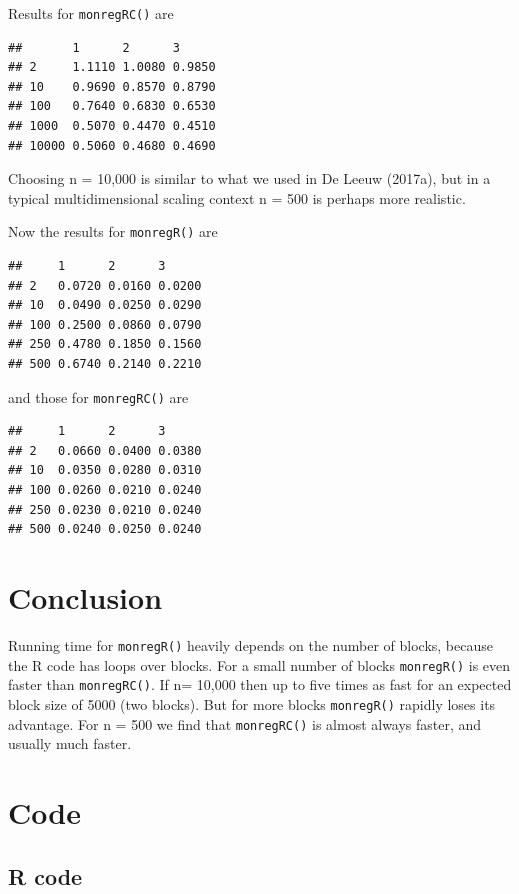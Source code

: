 \documentclass[12pt,]{article}
\begin{document}
Results for \texttt{monregRC()} are

\begin{verbatim}
##       1      2      3     
## 2     1.1110 1.0080 0.9850
## 10    0.9690 0.8570 0.8790
## 100   0.7640 0.6830 0.6530
## 1000  0.5070 0.4470 0.4510
## 10000 0.5060 0.4680 0.4690
\end{verbatim}

Choosing n = 10,000 is similar to what we used in De Leeuw (2017a), but
in a typical multidimensional scaling context n = 500 is perhaps more
realistic.

Now the results for \texttt{monregR()} are

\begin{verbatim}
##     1      2      3     
## 2   0.0720 0.0160 0.0200
## 10  0.0490 0.0250 0.0290
## 100 0.2500 0.0860 0.0790
## 250 0.4780 0.1850 0.1560
## 500 0.6740 0.2140 0.2210
\end{verbatim}

and those for \texttt{monregRC()} are

\begin{verbatim}
##     1      2      3     
## 2   0.0660 0.0400 0.0380
## 10  0.0350 0.0280 0.0310
## 100 0.0260 0.0210 0.0240
## 250 0.0230 0.0210 0.0240
## 500 0.0240 0.0250 0.0240
\end{verbatim}

\section{Conclusion}\label{conclusion}

Running time for \texttt{monregR()} heavily depends on the number of
blocks, because the R code has loops over blocks. For a small number of
blocks \texttt{monregR()} is even faster than \texttt{monregRC()}. If n=
10,000 then up to five times as fast for an expected block size of 5000
(two blocks). But for more blocks \texttt{monregR()} rapidly loses its
advantage. For n = 500 we find that \texttt{monregRC()} is almost always
faster, and usually much faster.

\section{Code}\label{code}

\subsection{R code}\label{r-code}
\end{document}

